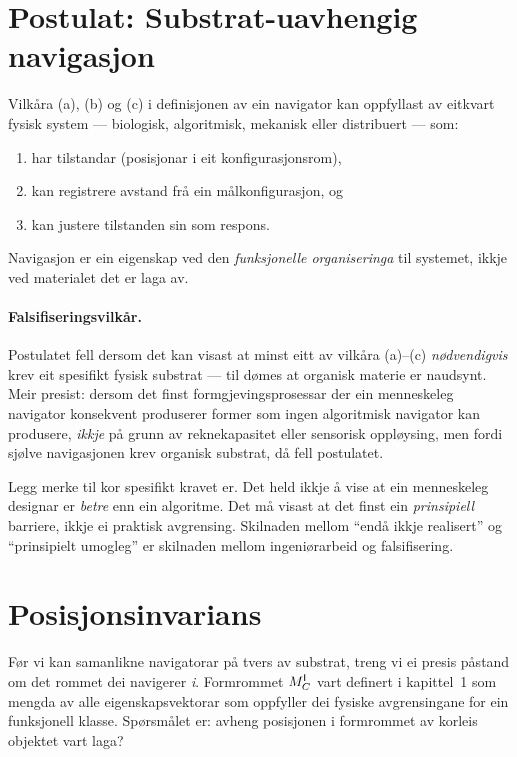 \section{Postulat: Substrat-uavhengig navigasjon}

\begin{postmark}\label{post:L.7.1}
Vilkåra (a), (b) og (c) i definisjonen av ein navigator kan
oppfyllast av eitkvart fysisk system --- biologisk, algoritmisk,
mekanisk eller distribuert --- som:
\begin{enumerate}[label=(\roman*),nosep]
  \item har tilstandar (posisjonar i eit konfigurasjonsrom),
  \item kan registrere avstand frå ein målkonfigurasjon, og
  \item kan justere tilstanden sin som respons.
\end{enumerate}
Navigasjon er ein eigenskap ved den \emph{funksjonelle
organiseringa} til systemet, ikkje ved materialet det er laga av.
\end{postmark}

\paragraph{Falsifiseringsvilkår.}
Postulatet fell dersom det kan visast at minst eitt av vilkåra
(a)--(c) \emph{nødvendigvis} krev eit spesifikt fysisk substrat
--- til dømes at organisk materie er naudsynt. Meir presist:
dersom det finst formgjevingsprosessar der ein menneskeleg
navigator konsekvent produserer former som ingen algoritmisk
navigator kan produsere, \emph{ikkje} på grunn av reknekapasitet
eller sensorisk oppløysing, men fordi sjølve navigasjonen krev
organisk substrat, då fell postulatet.

\medskip
Legg merke til kor spesifikt kravet er. Det held ikkje å vise at
ein menneskeleg designar er \emph{betre} enn ein algoritme. Det
må visast at det finst ein \emph{prinsipiell} barriere, ikkje ei
praktisk avgrensing. Skilnaden mellom ``endå ikkje realisert''
og ``prinsipielt umogleg'' er skilnaden mellom ingeniørarbeid
og falsifisering.


\section{Posisjonsinvarians}

Før vi kan samanlikne navigatorar på tvers av substrat, treng vi
ei presis påstand om det rommet dei navigerer \emph{i}. Formrommet
$M^{\mathsf{I}}_C$ vart definert i kapittel~1 som mengda av alle
eigenskapsvektorar som oppfyller dei fysiske avgrensingane for ein
funksjonell klasse. Spørsmålet er: avheng posisjonen i formrommet
av korleis objektet vart laga?

